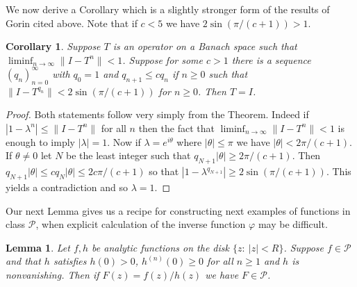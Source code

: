 \documentclass[12pt]{amsart}
\newtheorem{lemma}[thm]{Lemma}
\newtheorem{cor}[thm]{Corollary}
\begin{document}
We now derive a Corollary which is a slightly stronger form of the
results of Gorin cited above.  Note that if $c<5$ we have
$2\sin({\pi}/{(c+1)})>1$.


\begin{cor}\label{chernoffgorin2} Suppose $T$ is an operator on a Banach
space such that $\liminf_{n\to\infty}\|I-T^n\|<1$.  Suppose  for
some $c>1$ there is a sequence $(q_n)_{n=0}^{\infty}$ with $q_0=1$
and $q_{n+1}\le cq_n$  if $n\ge 0$ such that $\|I-T^{q_n}\|<
2\sin({\pi}/{(c+1)})$ for $n\ge 0$.  Then $T=I$.\end{cor}


\begin{proof} Both statements follow very simply from the Theorem.
 Indeed if $|1-\lambda^n|\le \|I-T^n\|$ for all $n$ then the fact
 that $\liminf_{n\to\infty}\|I-T^n\|<1$ is enough to imply
 $|\lambda|=1$.  Now if $\lambda=e^{i\theta}$ where $|\theta|\le \pi$ we have
 $|\theta|<2\pi/(c+1)$.  If $\theta\neq 0$ let $N$ be the least integer such that
 $q_{N+1}|\theta|\ge 2\pi/(c+1)$.  Then $q_{N+1}|\theta|\le cq_N|\theta|\le 2c\pi/(c+1)$ so that
 $|1-\lambda^{q_{N+1}}|\ge 2\sin(\pi/(c+1))$.  This yields a contradiction and so $\lambda=1$.
\end{proof}




Our next Lemma gives us a recipe for constructing next examples of
functions in class $\mathcal P$, when explicit calculation of the
inverse function $\varphi$ may be difficult.


\begin{lemma}\label{newfunctions}  Let $f,h$ be analytic functions on the disk $\{z:\
|z|<R\}$.  Suppose $f\in\mathcal P$ and that
  $h$ satisfies $h(0)>0$, $h^{(n)}(0)\ge 0$ for all $n\ge 1$ and $h$ is
nonvanishing.  Then if $F(z)=f(z)/h(z)$ we have $F\in\mathcal
P$.\end{lemma}
\end{document}
